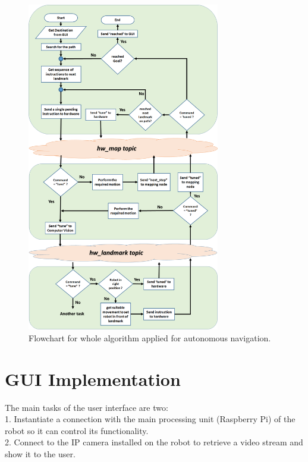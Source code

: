 \documentclass[12pt]{article}
\newcommand\blankpage{%
	\null
	\thispagestyle{empty}%
	\addtocounter{page}{-1}%
	\newpage}
\begin{document}
\newpage

\begin{figure}
	\centering
	\includegraphics[width =0.75\textwidth]{Fig/full-algorithm.png}
	\caption{Flowchart for whole algorithm applied for autonomous navigation.}
	\label{fig:full-algorithm}
\end{figure}
\newpage

\afterpage{\blankpage}



\section{GUI Implementation}
The main tasks of the user interface are two:\\
1. Instantiate a connection with the main processing unit (Raspberry Pi) of the robot so it can control its functionality.\\
2. Connect to the IP camera installed on the robot to retrieve a video stream and show it to the user.
\end{document}
